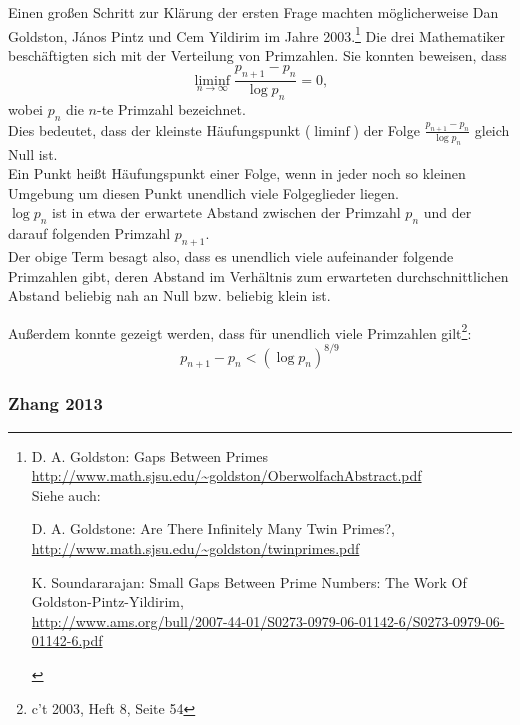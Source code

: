 \begin{refsegment}
Einen großen Schritt zur Klärung der ersten Frage machten möglicherweise
Dan Goldston, J\'{a}nos Pintz und Cem Yildirim im Jahre 2003.\footnote{%
    D. A. Goldston: \glqq Gaps Between Primes\grqq \\
    \url{http://www.math.sjsu.edu/~goldston/OberwolfachAbstract.pdf}\\
    Siehe auch:
    \begin{compactitem}
       \item D. A. Goldstone: \glqq Are There Infinitely Many Twin Primes?\grqq, \\
          \url{http://www.math.sjsu.edu/~goldston/twinprimes.pdf}
       \item K. Soundararajan: \glqq Small Gaps Between Prime Numbers:
           The Work Of Goldston-Pintz-Yildirim\grqq, \\
           \url{http://www.ams.org/bull/2007-44-01/S0273-0979-06-01142-6/S0273-0979-06-01142-6.pdf}
    \end{compactitem}
    \vspace{-\baselineskip} %
   }
Die drei Mathematiker beschäftigten sich mit der Verteilung von Primzahlen.
Sie konnten beweisen, dass  \[ \liminf_{n\to\infty}{\frac{p_{n+1}-p_n}{\log{p_n}}}=0,\]
wobei $p_{n}$ die $n$-te Primzahl bezeichnet. \\
Dies bedeutet, dass der kleinste Häufungspunkt ($\liminf$) der Folge
$\frac{p_{n+1}-p_n}{\log{p_n}}$ gleich Null ist.\\
Ein Punkt heißt Häufungspunkt einer Folge, wenn in jeder noch so kleinen
Umgebung um diesen Punkt unendlich viele Folgeglieder liegen. \\
$\log{p_n}$ ist in etwa der erwartete Abstand zwischen der Primzahl $p_n$
und der darauf folgenden Primzahl $p_{n+1}$.\\
Der obige Term besagt also, dass es unendlich viele aufeinander folgende
Primzahlen gibt, deren Abstand im Verhältnis zum erwarteten durchschnittlichen
Abstand beliebig nah an Null bzw. beliebig klein ist.

Außerdem konnte gezeigt werden, dass für unendlich viele Primzahlen
gilt\footnote{ c't 2003, Heft 8, Seite 54}: \[p_{n+1}-p_n < (\log{p_n})^{8/9}\]



\subsubsection{Zhang 2013}


\end{refsegment}
